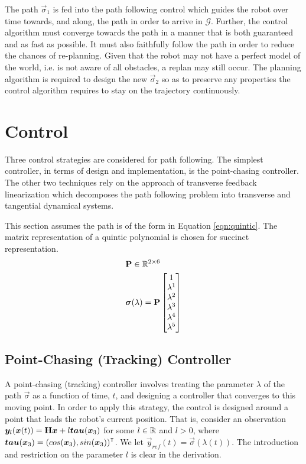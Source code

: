 \documentclass[oneside, 11pt]{book}
\begin{document}
The path $\vec{\sigma}_1$ is fed into the path following control which guides the robot over time towards, and along, the path in order to arrive in $\mathcal{G}$. Further, the control algorithm must converge towards the path in a manner that is both guaranteed and as fast as possible. It must also faithfully follow the path in order to reduce the chances of re-planning. Given that the robot may not have a perfect model of the world, i.e. is not aware of all obstacles, a replan may still occur. The planning algorithm is required to design the new $\vec{\sigma}_2$ so as to preserve any properties the control algorithm requires to stay on the trajectory continuously.

\chapter{Control}\label{sec:control}
Three control strategies are considered for path following. The simplest controller, in terms of design and implementation, is the point-chasing controller. The other two techniques rely on the approach of transverse feedback linearization which decomposes the path following problem into transverse and tangential dynamical systems.

This section assumes the path is of the form in Equation \ref{eqn:quintic}. The matrix representation of a quintic polynomial is chosen for succinct representation.
\begin{align}
    &\mathbf{P}\in\mathbb{R}^{2\times6} \nonumber \\
    &\bm{\sigma}(\lambda) =    \mathbf{P}
                                \begin{bmatrix}
                                    1 \\
                                    \lambda^1 \\
                                    \lambda^2 \\
                                    \lambda^3 \\
                                    \lambda^4 \\
                                    \lambda^5
                                \end{bmatrix}
    \label{eqn:quintic}
\end{align}

\section{Point-Chasing (Tracking) Controller}
A point-chasing (tracking) controller involves treating the parameter $\lambda$ of the path $\vec{\sigma}$ as a function of time, $t$, and designing a controller that converges to this moving point. In order to apply this strategy, the control is designed around a point that leads the robot's current position. That is, consider an observation $\bm{y}_l(\bm{x}(t)) = \mathbf{H}\bm{x} + l\bm{tau}(\bm{x}_3)$ for some $l\in\mathbb{R}$ and $l > 0$, where $\bm{tau}(\bm{x}_3)={(cos(\bm{x}_3),sin(\bm{x}_3))}^{\intercal}$. We let $\vec{y}_{ref}(t) = \vec{\sigma}\left(\lambda(t)\right)$. The introduction and restriction on the parameter $l$ is clear in the derivation.
\end{document}
